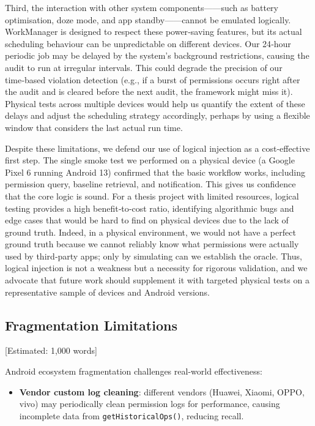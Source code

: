 Third, the interaction with other system components——such as battery optimisation, doze mode, and app standby——cannot be emulated logically. WorkManager is designed to respect these power‑saving features, but its actual scheduling behaviour can be unpredictable on different devices. Our 24‑hour periodic job may be delayed by the system's background restrictions, causing the audit to run at irregular intervals. This could degrade the precision of our time‑based violation detection (e.g., if a burst of permissions occurs right after the audit and is cleared before the next audit, the framework might miss it). Physical tests across multiple devices would help us quantify the extent of these delays and adjust the scheduling strategy accordingly, perhaps by using a flexible window that considers the last actual run time.

Despite these limitations, we defend our use of logical injection as a cost‑effective first step. The single smoke test we performed on a physical device (a Google Pixel 6 running Android 13) confirmed that the basic workflow works, including permission query, baseline retrieval, and notification. This gives us confidence that the core logic is sound. For a thesis project with limited resources, logical testing provides a high benefit‑to‑cost ratio, identifying algorithmic bugs and edge cases that would be hard to find on physical devices due to the lack of ground truth. Indeed, in a physical environment, we would not have a perfect ground truth because we cannot reliably know what permissions were actually used by third‑party apps; only by simulating can we establish the oracle. Thus, logical injection is not a weakness but a necessity for rigorous validation, and we advocate that future work should supplement it with targeted physical tests on a representative sample of devices and Android versions.

\subsection{Fragmentation Limitations} [Estimated: 1,000 words]

Android ecosystem fragmentation challenges real-world effectiveness:
\begin{itemize}
\item \textbf{Vendor custom log cleaning}: different vendors (Huawei, Xiaomi, OPPO, vivo) may periodically clean permission logs for performance, causing incomplete data from \texttt{getHistoricalOps()}, reducing recall.
\end{itemize}

